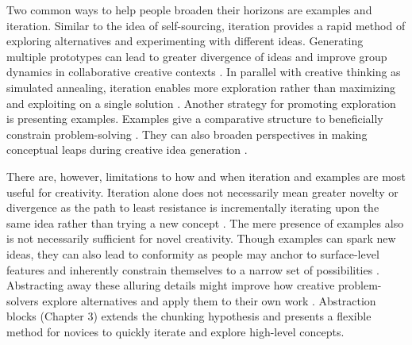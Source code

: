 Two common ways to help people broaden their horizons are examples and iteration. Similar to the idea of self-sourcing, iteration provides a rapid method of exploring alternatives and experimenting with different ideas. Generating multiple prototypes can lead to greater divergence of ideas \cite{Dow2009, Dow2010} and improve group dynamics in collaborative creative contexts \cite{Dow2011}. In parallel with creative thinking as simulated annealing, iteration enables more exploration rather than maximizing and exploiting on a single solution \cite{Dow2009, Dow2011, simon1972theories}. Another strategy for promoting exploration is presenting examples. Examples give a comparative structure to beneficially constrain problem-solving \cite{chi2012seeing,Chi1989,  gick1980analogical, loewenstein2003, Quilici2002, Schwartz2011, vanlehn1998analogy}. They can also broaden perspectives in making conceptual leaps during creative idea generation \cite{chan2011benefits, gentner1997analogy, marsh1996examples, Smith1993}. 

There are, however, limitations to how and when iteration and examples are most useful for creativity. Iteration alone does not necessarily mean greater novelty or divergence as the path to least resistance is incrementally iterating upon the same idea rather than trying a new concept \cite{Dow2010, Dow2009, Little2010}. The mere presence of examples also is not necessarily sufficient for novel creativity. Though examples can spark new ideas, they can also lead to conformity as people may anchor to surface-level features and inherently constrain themselves to a narrow set of possibilities \cite{jansson1991design, kulkarni2012early, marsh1996examples, Smith1993}. Abstracting away these alluring details might improve how creative problem-solvers explore alternatives and apply them to their own work \cite{Burgoon2013}. Abstraction blocks (Chapter 3) extends the chunking hypothesis and presents a flexible method for novices to quickly iterate and explore high-level concepts. 

